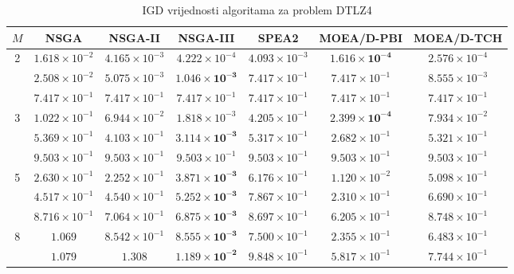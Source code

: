 \documentclass[times, utf8, zavrsni, numeric]{fer}
\begin{document}
\begin{table}[htb]
\caption{IGD vrijednosti algoritama za problem DTLZ4}
\label{tbl:dtlz4}
\centering
\small
\begin{tabular}{c|c|c|c|c|c|c} \hline
$M$ & NSGA & NSGA-II & NSGA-III & SPEA2 & MOEA/D-PBI & MOEA/D-TCH  \\ \hline
\multirow{3}{*}{2}  & $1.618\times 10^{-2}$    & $4.165\times 10^{-3}$ & $4.222\times 10^{-4}$ & $4.093\times 10^{-3}$ & $\mathbf{1.616\times 10^{-4}}$ & $2.576\times 10^{-4}$\\
			        & $2.508\times 10^{-2}$    & $5.075\times 10^{-3}$ & $\mathbf{1.046\times 10^{-3}}$ & $7.417\times 10^{-1}$ & $7.417\times 10^{-1}$ & $8.555\times 10^{-3}$\\
                    & $7.417\times 10^{-1}$    & $7.417\times 10^{-1}$ & $7.417\times 10^{-1}$ & $7.417\times 10^{-1}$ & $7.417\times 10^{-1}$ & $7.417\times 10^{-1}$\\ \hline
\multirow{3}{*}{3}  & $1.022\times 10^{-1}$    & $6.944\times 10^{-2}$ & $1.818\times 10^{-3}$ & $4.205\times 10^{-1}$ & $\mathbf{2.399\times 10^{-4}}$ & $7.934\times 10^{-2}$\\
			        & $5.369\times 10^{-1}$    & $4.103\times 10^{-1}$ & $\mathbf{3.114\times 10^{-3}}$ & $5.317\times 10^{-1}$ & $2.682\times 10^{-1}$ & $5.321\times 10^{-1}$\\
                    & $9.503\times 10^{-1}$    & $9.503\times 10^{-1}$ & $9.503\times 10^{-1}$ & $9.503\times 10^{-1}$ & $9.503\times 10^{-1}$ & $9.503\times 10^{-1}$\\ \hline
\multirow{3}{*}{5}  & $2.630\times 10^{-1}$    & $2.252\times 10^{-1}$ & $\mathbf{3.871\times 10^{-3}}$ & $6.176\times 10^{-1}$ & $1.120\times 10^{-2}$ & $5.098\times 10^{-1}$\\
			        & $4.517\times 10^{-1}$    & $4.540\times 10^{-1}$ & $\mathbf{5.252\times 10^{-3}}$ & $7.867\times 10^{-1}$ & $2.310\times 10^{-1}$ & $6.690\times 10^{-1}$\\
                    & $8.716\times 10^{-1}$    & $7.064\times 10^{-1}$ & $\mathbf{6.875\times 10^{-3}}$ & $8.697\times 10^{-1}$ & $6.205\times 10^{-1}$ & $8.748\times 10^{-1}$\\ \hline
\multirow{3}{*}{8}  & $1.069$                  & $8.542\times 10^{-1}$ & $\mathbf{8.555\times 10^{-3}}$ & $7.500\times 10^{-1}$ & $2.355\times 10^{-1}$ & $6.483\times 10^{-1}$\\
			        & $1.079$                  & $1.308$               & $\mathbf{1.189\times 10^{-2}}$ & $9.848\times 10^{-1}$ & $5.817\times 10^{-1}$ & $7.744\times 10^{-1}$\\

\end{tabular}
\end{table}
\end{document}
